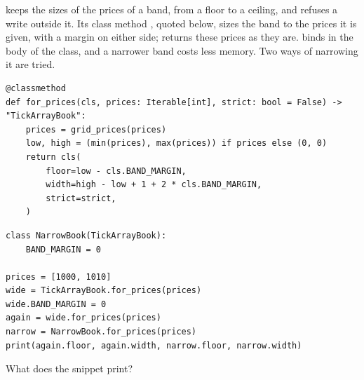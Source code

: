 \begin{question}
\label{question.bandMarginShadowedOnTheInstance}
 keeps the sizes of the prices of a band, from a floor to a ceiling,
and refuses a write outside it.
Its class method , quoted below, sizes the band to the prices it is given,
with a margin on either side;
 returns these prices as they are.
 binds  in the body of the class,
and a narrower band costs less memory.
Two ways of narrowing it are tried.
\begin{lstlisting}[caption={\protect\codehl{unito26.lob.orderbook.TickArrayBook.for\_prices}.}, label=listing.bandMarginShadowedOnTheInstanceQuote]
@classmethod
def for_prices(cls, prices: Iterable[int], strict: bool = False) -> "TickArrayBook":
    prices = grid_prices(prices)
    low, high = (min(prices), max(prices)) if prices else (0, 0)
    return cls(
        floor=low - cls.BAND_MARGIN,
        width=high - low + 1 + 2 * cls.BAND_MARGIN,
        strict=strict,
    )
\end{lstlisting}
\begin{lstlisting}[caption={A margin bound on an instance, and one bound on a subclass}, label=listing.bandMarginShadowedOnTheInstanceRun]
class NarrowBook(TickArrayBook):
    BAND_MARGIN = 0

prices = [1000, 1010]
wide = TickArrayBook.for_prices(prices)
wide.BAND_MARGIN = 0
again = wide.for_prices(prices)
narrow = NarrowBook.for_prices(prices)
print(again.floor, again.width, narrow.floor, narrow.width)
\end{lstlisting}
What does the snippet print?
\begin{choices}
 \choice {}
 \correctchoice {}
 \choice {}
 \choice {}
\end{choices}
\end{question}

